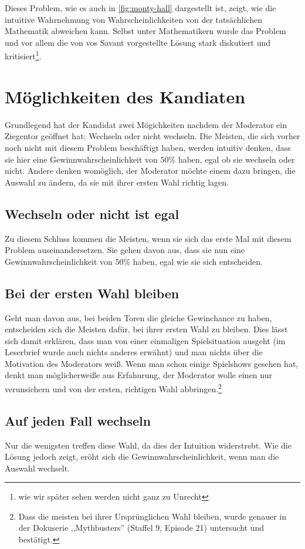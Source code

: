Dieses Problem, wie es auch in \autoref{fig:monty-hall} dargestellt ist, zeigt, wie die intuitive Wahrnehmung von Wahrscheinlichkeiten von der tatsächlichen Mathematik abweichen kann. Selbst unter Mathematikern wurde das Problem und vor allem die von vos Savant vorgestellte Lösung stark diskutiert und kritisiert\footnote{wie wir später sehen werden nicht ganz zu Unrecht}.

\section{Möglichkeiten des Kandiaten}

Grundlegend hat der Kandidat zwei Mögichkeiten nachdem der Moderator ein Ziegentor geöffnet hat: Wechseln oder nicht wechseln. Die Meisten, die sich vorher noch nicht mit diesem Problem beschäftigt haben, werden intuitiv denken, dass sie hier eine Gewinnwahrscheinlichkeit von $50\%$ haben, egal ob sie wechseln oder nicht. Andere denken womöglich, der Moderator möchte einem dazu bringen, die Auswahl zu ändern, da sie mit ihrer ersten Wahl richtig lagen.

\subsection{Wechseln oder nicht ist egal}

Zu diesem Schluss kommen die Meisten, wenn sie sich das erste Mal mit diesem Problem auseinandersetzen. Sie gehen davon aus, dass sie nun eine Gewinnwahrscheinlichkeit von $50\%$ haben, egal wie sie sich entscheiden.

\subsection{Bei der ersten Wahl bleiben}

Geht man davon aus, bei beiden Toren die gleiche Gewinchance zu haben, entscheiden sich die Meisten dafür, bei ihrer ersten Wahl zu bleiben. Dies lässt sich damit erklären, dass man von einer einmaligen Spielsituation ausgeht (im Leserbrief wurde auch nichts anderes erwähnt) und man nichts über die Motivation des Moderators weiß. Wenn man schon einige Spielshows gesehen hat, denkt man möglicherweiße aus Erfahurung, der Moderator wolle einen nur verunsichern und von der ersten, richtigen Wahl abbringen.\footnote{Dass die meisten bei ihrer Ursprünglichen Wahl bleiben, wurde genauer in der Dokuserie ,,Mythbusters'' (Staffel 9, Episode 21) untersucht und bestätigt.}

\subsection{Auf jeden Fall wechseln}

Nur die wenigsten treffen diese Wahl, da dies der Intuition widerstrebt. Wie die Lösung jedoch zeigt, eröht sich die Gewinnwahrscheinlichkeit, wenn man die Auswahl wechselt.


